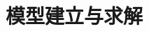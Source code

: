 \chapter[\hspace{0pt}模型建立与求解]{{\heiti{}\hspace{0pt}模型建立与求解}}\label{chapter4: 模型建立与求解}

\removelofgap
\removelotgap

% 



